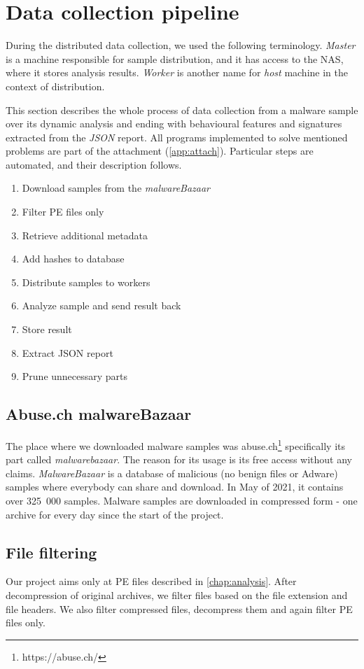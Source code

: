 \section{Data collection pipeline}
During the distributed data collection, we used the following terminology. \emph{Master} is a machine responsible for sample distribution, and it has access to the NAS, where it stores analysis results. \emph{Worker} is another name for \emph{host} machine in the context of distribution.

This section describes the whole process of data collection from a malware sample over its dynamic analysis and ending with behavioural features and signatures extracted from the \emph{JSON} report. All programs implemented to solve mentioned problems are part of the attachment (\ref{app:attach}). Particular steps are automated, and their description follows.

\begin{enumerate}
    \itemsep0em 
    \item Download samples from the \emph{malwareBazaar}
    \item Filter PE files only
    \item Retrieve additional metadata
    \item Add hashes to database
    \item Distribute samples to workers
    \item Analyze sample and send result back
    \item Store result
    \item Extract JSON report
    \item Prune unnecessary parts
\end{enumerate}


\subsection{Abuse.ch malwareBazaar}
The place where we downloaded malware samples was abuse.ch\footnote{https://abuse.ch/} specifically its part called \emph{malwarebazaar}. The reason for its usage is its free access without any claims. \emph{MalwareBazaar} is a database of malicious (no benign files or Adware) samples where everybody can share and download. In May of 2021, it contains over 325~000 samples. Malware samples are downloaded in compressed form - one archive for every day since the start of the project.

\subsection{File filtering}
Our project aims only at PE files described in \ref{chap:analysis}. After decompression of original archives, we filter files based on the file extension and file headers. We also filter compressed files, decompress them and again filter PE files only.


